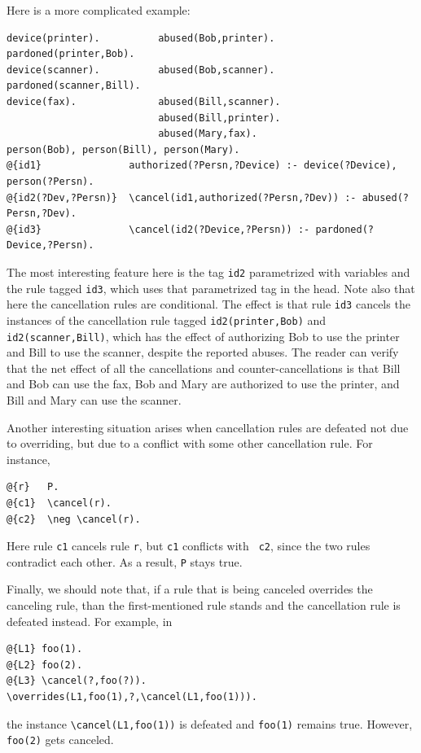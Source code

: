 \documentclass[11pt]{article}
\newcommand{\bs}{\textbackslash}
\begin{document}
Here is a more complicated example:
\begin{verbatim}
device(printer).          abused(Bob,printer).       pardoned(printer,Bob).
device(scanner).          abused(Bob,scanner).       pardoned(scanner,Bill).
device(fax).              abused(Bill,scanner).
                          abused(Bill,printer).
                          abused(Mary,fax).
person(Bob), person(Bill), person(Mary).
@{id1}               authorized(?Persn,?Device) :- device(?Device), person(?Persn).
@{id2(?Dev,?Persn)}  \cancel(id1,authorized(?Persn,?Dev)) :- abused(?Persn,?Dev).
@{id3}               \cancel(id2(?Device,?Persn)) :- pardoned(?Device,?Persn).
\end{verbatim}
The most interesting feature here is the tag {\tt id2} parametrized with
variables and the rule tagged {\tt id3}, which uses that parametrized
tag in the head. Note also that here the cancellation rules are conditional.
The effect is that rule {\tt id3} cancels the instances 
of the cancellation rule tagged {\tt id2(printer,Bob)} and
{\tt id2(scanner,Bill)}, which has the effect of authorizing Bob to use the
printer and Bill to use the scanner, despite the reported abuses.  
The reader can verify that the net effect of all the cancellations and
counter-cancellations is that Bill and Bob can use the fax, Bob and Mary
are authorized to use the printer, and Bill and Mary can use the scanner.

Another interesting situation arises when cancellation rules are defeated
not due to overriding, but due to a conflict with some other cancellation
rule. For instance,
\begin{verbatim}
@{r}   P.
@{c1}  \cancel(r).
@{c2}  \neg \cancel(r).
\end{verbatim}
Here rule {\tt c1} cancels rule {\tt r}, but {\tt c1} conflicts with {\tt
  c2}, since the two rules contradict each other. As a result, {\tt P}      
stays true.

Finally, we should note that, if a rule that is being canceled overrides
the canceling rule, than the first-mentioned rule stands and the
cancellation rule is defeated instead. For example, in
\begin{verbatim}
@{L1} foo(1).
@{L2} foo(2).
@{L3} \cancel(?,foo(?)).  
\overrides(L1,foo(1),?,\cancel(L1,foo(1))).
\end{verbatim}
the instance {\tt \bs{}cancel(L1,foo(1))} is defeated and {\tt foo(1)}
remains true. However, {\tt foo(2)} gets canceled.
\end{document}

